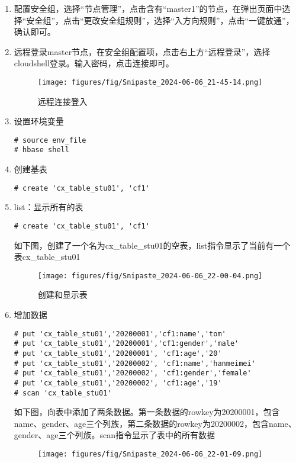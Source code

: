 \documentclass[12pt,hyperref,a4paper,UTF8]{ctexart}
\begin{document}
\begin{enumerate}
    \item 配置安全组，选择“节点管理”，点击含有“master1”的节点，在弹出页面中选择“安全组”，点击“更改安全组规则”，选择“入方向规则”，点击“一键放通”，确认即可。
    \item 远程登录master节点，在安全组配置项，点击右上方“远程登录”，选择cloudshell登录。输入密码，点击连接即可。
    \begin{figure}[H]
        \centering
        \texttt{[image: figures/fig/Snipaste\_2024-06-06\_21-45-14.png]}
        \caption{远程连接登入}
        \label{fig:8}
    \end{figure}
    \item 设置环境变量
    \begin{verbatim}
# source env_file 
# hbase shell
    \end{verbatim}
    \item 创建基表
    \begin{verbatim}
# create 'cx_table_stu01', 'cf1'
    \end{verbatim}
    \item list：显示所有的表
    \begin{verbatim}
# create 'cx_table_stu01', 'cf1'
    \end{verbatim}
    如下图，创建了一个名为cx\_table\_stu01的空表，list指令显示了当前有一个表cx\_table\_stu01
    \begin{figure}[H]
        \centering
        \texttt{[image: figures/fig/Snipaste\_2024-06-06\_22-00-04.png]}
        \caption{创建和显示表}
        \label{fig:8}
    \end{figure}
    \item 增加数据
    \begin{verbatim}
# put 'cx_table_stu01','20200001','cf1:name','tom'
# put 'cx_table_stu01','20200001','cf1:gender','male'
# put 'cx_table_stu01','20200001', 'cf1:age','20'
# put 'cx_table_stu01','20200002', 'cf1:name','hanmeimei'
# put 'cx_table_stu01','20200002', 'cf1:gender','female'
# put 'cx_table_stu01','20200002', 'cf1:age','19'
# scan 'cx_table_stu01'
    \end{verbatim}
    如下图，向表中添加了两条数据。第一条数据的rowkey为20200001，包含name、gender、age三个列族，第二条数据的rowkey为20200002，包含name、gender、age三个列族。scan指令显示了表中的所有数据
    \begin{figure}[H]
        \centering
        \texttt{[image: figures/fig/Snipaste\_2024-06-06\_22-01-09.png]}

\end{figure}
\end{enumerate}
\end{document}

